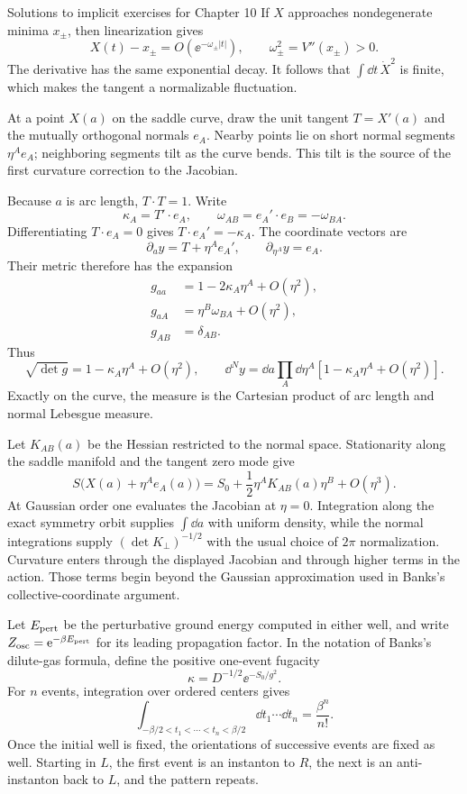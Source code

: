 \begin{bankssolutions}{Solutions to implicit exercises for Chapter 10}
If $X$ approaches nondegenerate minima $x_\pm$, then linearization gives
\[
  X(t)-x_\pm=O(\ee^{-\omega_\pm|t|}),
  \qquad \omega_\pm^2=V''(x_\pm)>0.
\]
The derivative has the same exponential decay.  It follows that
$\int\dd t\,\dot X^2$ is finite, which makes the tangent a normalizable
fluctuation.

At a point $X(a)$ on the saddle curve, draw the unit tangent
$T=X'(a)$ and the mutually orthogonal normals $e_A$.  Nearby points lie on
short normal segments $\eta^Ae_A$; neighboring segments tilt as the curve
bends.  This tilt is the source of the first curvature correction to the
Jacobian.

Because $a$ is arc length, $T\cdot T=1$.  Write
\[
  \kappa_A=T'\cdot e_A,
  \qquad
  \omega_{AB}=e_A'\cdot e_B=-\omega_{BA}.
\]
Differentiating $T\cdot e_A=0$ gives $T\cdot e_A'=-\kappa_A$.  The coordinate
vectors are
\[
  \partial_a y=T+\eta^Ae_A',
  \qquad
  \partial_{\eta^A}y=e_A.
\]
Their metric therefore has the expansion
\[
\begin{aligned}
  g_{aa}&=1-2\kappa_A\eta^A+O(\eta^2),\\
  g_{aA}&=\eta^B\omega_{BA}+O(\eta^2),\\
  g_{AB}&=\delta_{AB}.
\end{aligned}
\]
Thus
\[
  \sqrt{\det g}=1-\kappa_A\eta^A+O(\eta^2),
  \qquad
  \dd^Ny=\dd a\prod_A\dd\eta^A
  \left[1-\kappa_A\eta^A+O(\eta^2)\right].
\]
Exactly on the curve, the measure is the Cartesian product of arc length and
normal Lebesgue measure.

Let $K_{AB}(a)$ be the Hessian restricted to the normal space.  Stationarity
along the saddle manifold and the tangent zero mode give
\[
  S\bigl(X(a)+\eta^Ae_A(a)\bigr)
  =S_0+\frac12\eta^AK_{AB}(a)\eta^B+O(\eta^3).
\]
At Gaussian order one evaluates the Jacobian at $\eta=0$.  Integration along
the exact symmetry orbit supplies $\int\dd a$ with uniform density, while the
normal integrations supply $(\det K_\perp)^{-1/2}$ with the usual choice of
$2\pi$ normalization.  Curvature enters through the displayed Jacobian and
through higher terms in the action.  Those terms begin beyond the Gaussian
approximation used in Banks's collective-coordinate argument.

Let $E_{\rm pert}$ be the perturbative ground energy computed in either well,
and write $Z_{\rm osc}=\mathrm{e}^{-\beta E_{\rm pert}}$ for its leading propagation
factor.  In the notation of Banks's dilute-gas formula, define the positive
one-event fugacity
\[
  \kappa=D^{-1/2}\ee^{-S_0/g^2}.
\]
For $n$ events, integration over ordered centers gives
\[
  \int_{-\beta/2<t_1<\cdots<t_n<\beta/2}
  \dd t_1\cdots\dd t_n=\frac{\beta^n}{n!}.
\]
Once the initial well is fixed, the orientations of successive events are
fixed as well.  Starting in $L$, the first event is an instanton to $R$, the
next is an anti-instanton back to $L$, and the pattern repeats.


\end{bankssolutions}
